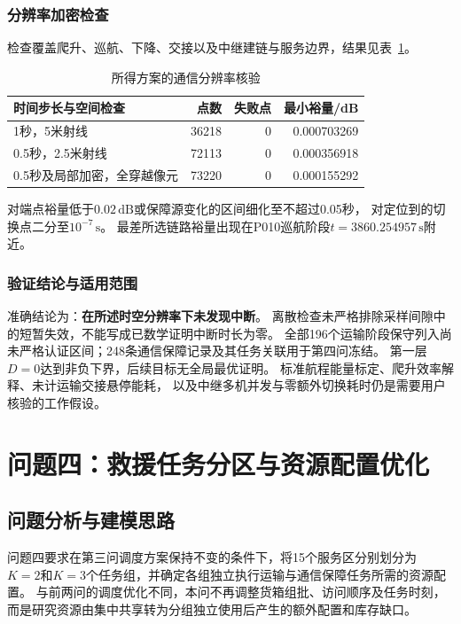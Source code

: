 \documentclass[bwprint]{gmcmthesis}
\begin{document}
\subsubsection{分辨率加密检查}
检查覆盖爬升、巡航、下降、交接以及中继建链与服务边界，结果见表~\ref{tab:q3_refinement}。
\begin{table}[htbp]
\centering
\small
\caption{所得方案的通信分辨率核验}
\label{tab:q3_refinement}
\begin{tabular}{lrrr}
\toprule
时间步长与空间检查 & 点数 & 失败点 & 最小裕量/dB \\
\midrule
1秒，5米射线 & 36218 & 0 & 0.000703269 \\
0.5秒，2.5米射线 & 72113 & 0 & 0.000356918 \\
0.5秒及局部加密，全穿越像元 & 73220 & 0 & 0.000155292 \\
\bottomrule
\end{tabular}
\end{table}

对端点裕量低于$0.02\,\mathrm{dB}$或保障源变化的区间细化至不超过0.05秒，
对定位到的切换点二分至$10^{-7}\,\mathrm{s}$。
最差所选链路裕量出现在P010巡航阶段$t=3860.254957\,\mathrm{s}$附近。

\subsubsection{验证结论与适用范围}
准确结论为：\textbf{在所述时空分辨率下未发现中断}。
离散检查未严格排除采样间隙中的短暂失效，不能写成已数学证明中断时长为零。
全部196个运输阶段保守列入尚未严格认证区间；248条通信保障记录及其任务关联用于第四问冻结。
第一层$D=0$达到非负下界，后续目标无全局最优证明。
标准航程能量标定、爬升效率解释、未计运输交接悬停能耗，
以及中继多机并发与零额外切换耗时仍是需要用户核验的工作假设。

\section{问题四：救援任务分区与资源配置优化}

\subsection{问题分析与建模思路}

问题四要求在第三问调度方案保持不变的条件下，将15个服务区分别划分为
$K=2$和$K=3$个任务组，并确定各组独立执行运输与通信保障任务所需的资源配置。
与前两问的调度优化不同，本问不再调整货箱组批、访问顺序及任务时刻，
而是研究资源由集中共享转为分组独立使用后产生的额外配置和库存缺口。
\end{document}
